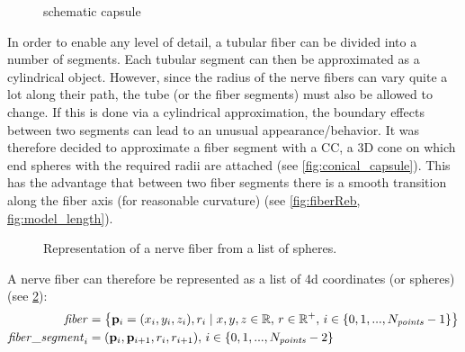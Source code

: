 % 
\begin{figure}[!t]
    \centering
    \setlength{\tikzwidth}{0.5\textwidth}
	\caption{schematic capsule}
	\label{fig:conical}
\end{figure}
% 
In order to enable any level of detail, a tubular fiber can be divided into a number of segments.
Each tubular segment can then be approximated as a cylindrical object.
However, since the radius of the nerve fibers can vary quite a lot along their path, the tube (or the fiber segments) must also be allowed to change.
If this is done via a cylindrical approximation, the boundary effects between two segments can lead to an unusual appearance/behavior.
It was therefore decided to approximate a fiber segment with a \ac{CC}, a 3D cone on which end spheres with the required radii are attached (see \cref{fig:conical_capsule}).
This has the advantage that between two fiber segments there is a smooth transition along the fiber axis (for reasonable curvature) (see \cref{fig:fiberReb, fig:model_length}).
% 
\begin{figure}[!t]
    \setlength{\tikzwidth}{0.85\textwidth}
    \centering
	\caption[]{Representation of a nerve fiber from a list of spheres.}
	\label{fig:fiberReb}
\end{figure}
% 
A nerve fiber can therefore be represented as a list of 4d coordinates (or spheres) (see \cref{fig:fiberReb}):
\begin{align}
\begin{split}
\mathit{fiber} &= \left\{ \mathbf{p}_i=(x_i,y_i,z_i), r_i \mid x,y,z \in \mathbb{R}, \, r \in \mathbb{R^+}, \, i \in \{0,1,...,N_{\mathit{points}}-1\}\right\} \\
\mathit{fiber\_segment}_i &= (\mathbf{p}_i, \mathbf{p}_{i+1}, r_i, r_{i+1}), \, i \in \{0,1,...,N_{\mathit{points}}-2\}
\end{split}
\end{align}
% 

